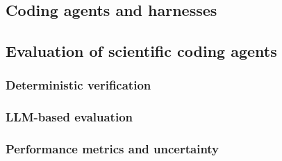 \lipsum[1][1-3]

\subsection{Coding agents and harnesses}

\lipsum[1][1-3]

\subsection{Evaluation of scientific coding agents}

\lipsum[1][1-3]

\subsubsection{Deterministic verification}

\lipsum[1][1-3]

\subsubsection{LLM-based evaluation}

\lipsum[1][1-3]

\subsubsection{Performance metrics and uncertainty}

\lipsum[1][1-3]
